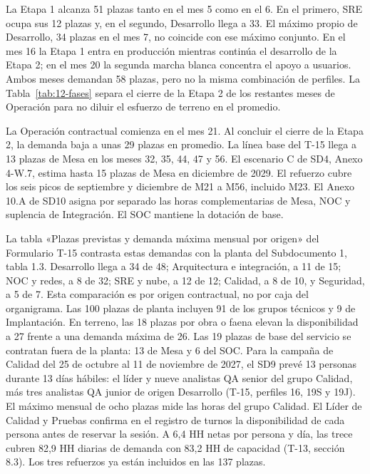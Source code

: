 La Etapa 1 alcanza 51 plazas tanto en el mes 5 como en el 6. En el primero, SRE ocupa sus 12 plazas y, en el segundo, Desarrollo llega a 33. El máximo propio de Desarrollo, 34 plazas en el mes 7, no coincide con ese máximo conjunto. En el mes 16 la Etapa 1 entra en producción mientras continúa el desarrollo de la Etapa 2; en el mes 20 la segunda marcha blanca concentra el apoyo a usuarios. Ambos meses demandan 58 plazas, pero no la misma combinación de perfiles. La Tabla~\ref{tab:12-fases} separa el cierre de la Etapa 2 de los restantes meses de Operación para no diluir el esfuerzo de terreno en el promedio.


La Operación contractual comienza en el mes 21. Al concluir el cierre de la Etapa 2, la demanda baja a unas 29 plazas en promedio. La línea base del T-15 llega a 13 plazas de Mesa en los meses 32, 35, 44, 47 y 56. El escenario C de SD4, Anexo 4-W.7, estima hasta 15 plazas de Mesa en diciembre de 2029. El refuerzo cubre los seis picos de septiembre y diciembre de M21 a M56, incluido M23. El Anexo 10.A de SD10 asigna por separado las horas complementarias de Mesa, NOC y suplencia de Integración. El SOC mantiene la dotación de base.

La tabla «Plazas previstas y demanda máxima mensual por origen» del Formulario T-15 contrasta estas demandas con la planta del Subdocumento 1, tabla 1.3. Desarrollo llega a 34 de 48; Arquitectura e integración, a 11 de 15; NOC y redes, a 8 de 32; SRE y nube, a 12 de 12; Calidad, a 8 de 10, y Seguridad, a 5 de 7. Esta comparación es por origen contractual, no por caja del organigrama. Las 100 plazas de planta incluyen 91 de los grupos técnicos y 9 de Implantación. En terreno, las 18 plazas por obra o faena elevan la disponibilidad a 27 frente a una demanda máxima de 26. Las 19 plazas de base del servicio se contratan fuera de la planta: 13 de Mesa y 6 del SOC. Para la campaña de Calidad del 25 de octubre al 11 de noviembre de 2027, el SD9 prevé 13 personas durante 13 días hábiles: el líder y nueve analistas QA senior del grupo Calidad, más tres analistas QA junior de origen Desarrollo (T-15, perfiles 16, 19S y 19J). El máximo mensual de ocho plazas mide las horas del grupo Calidad. El Líder de Calidad y Pruebas confirma en el registro de turnos la disponibilidad de cada persona antes de reservar la sesión. A 6,4 HH netas por persona y día, las trece cubren 82,9 HH diarias de demanda con 83,2 HH de capacidad (T-13, sección 8.3). Los tres refuerzos ya están incluidos en las 137 plazas.

